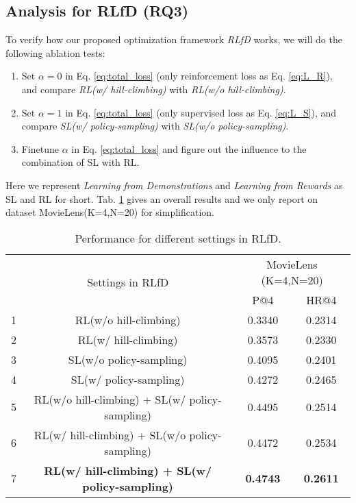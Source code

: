 \subsection{Analysis for RLfD (RQ3)}
To verify how our proposed optimization framework \emph{RLfD} works,
we will do the following ablation tests:
\begin{enumerate}[(1)]
\item Set $\alpha=0$ in Eq. \ref{eq:total_loss} (only reinforcement loss as Eq. \ref{eq:L_R}), and compare \emph{RL(w/ hill-climbing)} with \emph{RL(w/o hill-climbing)}.
\item Set $\alpha=1$ in Eq. \ref{eq:total_loss} (only supervised loss as Eq. \ref{eq:L_S}), and compare \emph{SL(w/ policy-sampling)} with \emph{SL(w/o policy-sampling)}.
\item Finetune $\alpha$ in Eq. \ref{eq:total_loss} and figure out the influence to the combination of SL with RL.
\end{enumerate}
Here we represent \emph{Learning from Demonstrations} and \emph{Learning from Rewards} as SL and RL for short.
Tab. \ref{tab:ablation_test} gives an overall results and we only report on dataset MovieLens(K=4,N=20) for simplification.
\begin{table}[h]
	\caption{Performance for different settings in RLfD.}
	\centering
	\scriptsize
	\begin{tabular}{cc|c|c}
		\toprule
		\multirow{2}{*}{} & \multirow{2}{*}{Settings in RLfD} & \multicolumn{2}{c}{MovieLens (K=4,N=20)} \\
		\cmidrule{3-4}
		& & P@4 & HR@4 \\
		\cmidrule{1-4}
		1 & RL(w/o hill-climbing) & 0.3340 & 0.2314 \\
		2 & RL(w/ hill-climbing) &  0.3573 & 0.2330 \\
		3 & SL(w/o policy-sampling) & 0.4095 & 0.2401 \\
		4 & SL(w/ policy-sampling) & 0.4272 & 0.2465 \\
		5 & RL(w/o hill-climbing) + SL(w/ policy-sampling) & 0.4495 & 0.2514 \\
		6 & RL(w/ hill-climbing) + SL(w/o policy-sampling) & 0.4472 & 0.2534 \\
		7 & \textbf{RL(w/ hill-climbing) + SL(w/ policy-sampling)} & \textbf{0.4743} & \textbf{0.2611} \\
		\bottomrule
	\end{tabular}
	\label{tab:ablation_test}
\end{table}


